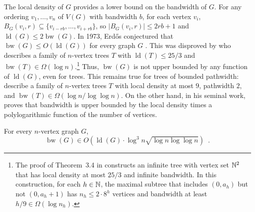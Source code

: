 \documentclass{patmorin}
\renewcommand{\le}{\leqslant}
\renewcommand{\leq}{\leqslant}
\DeclareMathOperator{\bw}{bw}
\DeclareMathOperator{\ld}{ld}
\begin{document}
The local density of $G$ provides a lower bound on the bandwidth of $G$. For any ordering $v_1,\dots,v_n$ of $V(G)$ with bandwidth $b$, for each vertex $v_i$, $B_G(v_i,r) \subseteq \{v_{i-rb},\dots,v_{i+rb}\}$, so $|B_G(v_i,r)|\leq 2rb+1$ and $\ld(G)\leq 2\bw(G)$. In 1973, Erd\H{o}s conjectured that $\bw(G)\leq O(\ld(G))$ for every graph $G$ \cite[Section~3]{ccdg82}. This was disproved by \citet{chvatalova:on} who describes a family of $n$-vertex trees $T$ with $\ld(T)\le 25/3$ and $\bw(T)\in\Omega(\log n)$.\footnote{The proof of Theorem~3.4 in \cite{chvatalova:on} constructs an infinite tree with vertex set $\mathbb{N}^2$ that has local density at most $25/3$ and infinite bandwidth.  In this construction, for each $h\in\mathbb{N}$, the maximal subtree that includes $(0,a_h)$ but not $(0,a_{h}+1)$ has $n_h\le 2\cdot 8^{h}$ vertices and bandwidth at least $h/9\in\Omega(\log n_h)$.} Thus, $\bw(G)$ is not upper bounded by any function of $\ld(G)$, even for trees. This remains true for trees of bounded pathwidth: \citet{CS89} describe a family of $n$-vertex trees $T$ with local density at most $9$, pathwidth $2$, and  $\bw(T)\in\Omega(\log n/\log\log n)$. On the other hand, in his seminal work, \citet{feige:approximating} proves that bandwidth is upper bounded by the local density times a polylogarithmic function of the number of vertices.


\begin{thm}
\label{feige_bandwidth_vs_density}
  For every $n$-vertex graph $G$,
  \[
    \bw(G)\in O\left(\ld(G)\cdot \log^3 n\sqrt{\log n\log\log n}\right) \enspace .
  \]
\end{thm}
\end{document}
